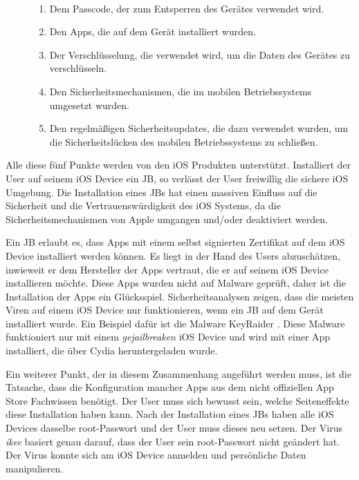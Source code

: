 \begin{description}
    \item[\parbox{\textwidth} {Die Sicherheit und Vertrauenswürdigkeit eines mobilen Gerätes hängt von mehreren Faktoren ab}]~\par
    \begin{enumerate}
        \item Dem Passcode, der zum Entsperren des Gerätes verwendet wird.
        \item Den Apps, die auf dem Gerät installiert wurden. 
        \item Der Verschlüsselung, die verwendet wird, um die Daten des Gerätes zu verschlüsseln.
        \item Den Sicherheitsmechanismen, die im mobilen Betriebssystems umgesetzt wurden.
        \item Den regelmäßigen Sicherheitsupdates, die dazu verwendet wurden, um die Sicherheitslücken des mobilen Betriebssystems zu schließen.  
    \end{enumerate}
\end{description} 
Alle diese fünf Punkte werden von den iOS Produkten unterstützt. Installiert der User auf seinem iOS Device ein JB, so verlässt der User freiwillig die sichere iOS Umgebung. Die Installation eines JBs hat einen massiven Einfluss auf die Sicherheit und die Vertrauenswürdigkeit des iOS Systems, da die Sicherheitsmechanismen von Apple umgangen und/oder deaktiviert werden.\par  
Ein JB erlaubt es, dass Apps mit einem selbst signierten Zertifikat auf dem iOS Device installiert werden können. Es liegt in der Hand des Users abzuschätzen, inwieweit er dem Hersteller der Apps vertraut, die er auf seinem iOS Device installieren möchte. Diese Apps wurden nicht auf Malware geprüft, daher ist die Installation der Apps ein Glücksspiel. Sicherheitsanalysen zeigen, dass die meisten Viren auf einem iOS Device nur funktionieren, wenn ein JB auf dem Gerät installiert wurde. Ein Beispiel dafür ist die Malware KeyRaider \cite{KeyRaider}. Diese Malware funktioniert nur mit einem \textit{\glqq gejailbreaken\grqq{}} iOS Device und wird mit einer App installiert, die über Cydia heruntergeladen wurde. \par 
 Ein weiterer Punkt, der in diesem Zusammenhang angeführt werden muss, ist die Tatsache, dass die Konfiguration mancher Apps aus dem nicht offiziellen App Store Fachwissen benötigt. Der User muss sich bewusst sein, welche Seiteneffekte diese Installation haben kann. Nach der Installation eines JBs haben alle iOS Devices dasselbe root-Passwort und der User muss dieses neu setzen. Der Virus \textit{\glqq ikee\grqq{}} basiert genau darauf, dass der User sein root-Passwort nicht geändert hat. Der Virus konnte sich am iOS Device anmelden und persönliche Daten manipulieren.\par 
